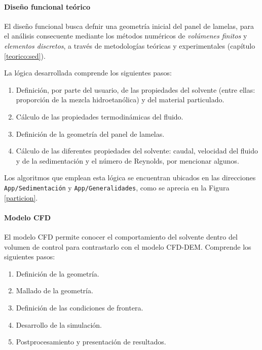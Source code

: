 \paragraph{Dise\~no funcional te\'orico}

\noindent
\justify

El dise\~no funcional busca defnir una geometr\'ia inicial del panel de lamelas, para el an\'alisis consecuente mediante los m\'etodos num\'ericos de \textit{vol\'umenes finitos} y \textit{elementos discretos}, a trav\'es de metodolog\'ias te\'oricas y experimentales (cap\'itulo \ref{teorico:sed}).

\noindent
\justify

La l\'ogica desarrollada comprende los siguientes pasos:

\begin{enumerate}
	\item Definici\'on, por parte del usuario, de las propiedades del solvente (entre ellas: proporci\'on de la mezcla hidroetan\'olica) y del material particulado.
	\item C\'alculo de las propiedades termodin\'amicas del fluido.
	\item Definici\'on de la geometr\'ia del panel de lamelas.
	\item C\'alculo de las diferentes propiedades del solvente: caudal, velocidad del fluido y de la sedimentaci\'on y el n\'umero de Reynolds, por mencionar algunos.
\end{enumerate}

\noindent
\justify

Los algoritmos que emplean esta l\'ogica se encuentran ubicados en las direcciones \texttt{App/Sedimentaci\'on} y \texttt{App/Generalidades}, como se aprecia en la Figura \ref{particion}.

\paragraph{Modelo CFD} \label{imp:CFD}

\noindent
\justify

El modelo CFD permite conocer el comportamiento del solvente dentro del volumen de control para contrastarlo con el modelo CFD-DEM. Comprende los siguientes pasos:

\begin{enumerate}
	\item Definici\'on de la geometr\'ia.
	\item Mallado de la geometr\'ia.
	\item Definici\'on de las condiciones de frontera.
	\item Desarrollo de la simulaci\'on.
	\item Postprocesamiento y presentaci\'on de resultados.
\end{enumerate}

